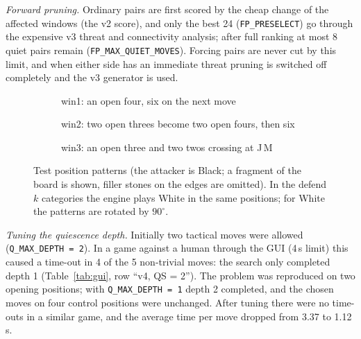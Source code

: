 \documentclass[a4paper,10pt,twocolumn]{article}
\newcommand{\code}[1]{\texttt{#1}}
\newcommand{\board}[4]{%
  \fill[board] (#1-0.6,-#3+0.6) rectangle (#2+0.6,-#4-0.6);
  \foreach \c in {#1,...,#2} {\draw[black!60,line width=0.3pt] (\c,-#3) -- (\c,-#4);
     \node[font=\tiny\ttfamily,above] at (\c,-#3+0.45) {\pgfmathparse{int(\c+64)}\char\pgfmathresult};}
  \foreach \r in {#3,...,#4} {\draw[black!60,line width=0.3pt] (#1,-\r) -- (#2,-\r);
     \node[font=\tiny\ttfamily,left] at (#1-0.45,-\r) {\pgfmathparse{int(\r+64)}\char\pgfmathresult};}
}
\newcommand{\B}[2]{\node[bstone] at (#1,-#2) {};}
\newcommand{\W}[2]{\node[wstone] at (#1,-#2) {};}
\begin{document}
\emph{Forward pruning.} Ordinary pairs are first scored by the cheap change of the affected windows (the v2 score), and only the best 24 (\code{FP\_PRESELECT}) go through the expensive v3 threat and connectivity analysis; after full ranking at most 8 quiet pairs remain (\code{FP\_MAX\_QUIET\_MOVES}). Forcing pairs are never cut by this limit, and when either side has an immediate threat pruning is switched off completely and the v3 generator is used.

\begin{figure}[t]
\centering
\begin{subfigure}[t]{0.32\textwidth}\centering
{}
\caption{win1: an open four, six on the next move}
\end{subfigure}\hfill
\begin{subfigure}[t]{0.32\textwidth}\centering
{}
\caption{win2: two open threes become two open fours, then six}
\end{subfigure}\hfill
\begin{subfigure}[t]{0.32\textwidth}\centering
{}
\caption{win3: an open three and two twos crossing at J\,M}
\end{subfigure}
\caption{Test position patterns (the attacker is Black; a fragment of the board is shown, filler stones on the edges are omitted). In the defend$k$ categories the engine plays White in the same positions; for White the patterns are rotated by $90^\circ$.}
\label{fig:positions}
\end{figure}

\emph{Tuning the quiescence depth.} Initially two tactical moves were allowed (\code{Q\_MAX\_DEPTH = 2}). In a game against a human through the GUI (4\,s limit) this caused a time-out in 4 of the 5 non-trivial moves: the search only completed depth 1 (Table~\ref{tab:gui}, row ``v4, QS = 2''). The problem was reproduced on two opening positions; with \code{Q\_MAX\_DEPTH = 1} depth 2 completed, and the chosen moves on four control positions were unchanged. After tuning there were no time-outs in a similar game, and the average time per move dropped from 3.37 to 1.12\,s.
\end{document}
